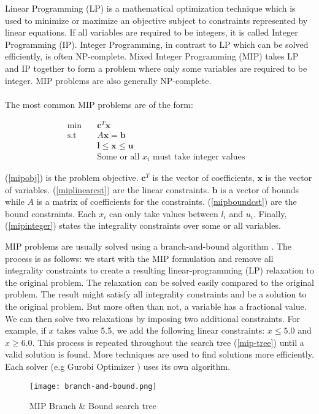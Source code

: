 \documentclass[../../thesis.tex]{subfiles}
\begin{document}
Linear Programming (LP) is a mathematical optimization technique which is used to minimize or maximize 
an objective subject to constraints represented by linear equations. 
If all variables are required to be integers, it is called Integer Programming (IP). 
Integer Programming, in contrast to LP which can be solved efficiently, is often NP-complete.  
Mixed Integer Programming (MIP) takes LP and IP together to form a problem where only some variables 
are required to be integer. MIP problems are also generally NP-complete.

\paragraph{}

The most common MIP problems are of the form:

\begin{align}
  \textrm{min} \quad & \bm{c}^T\bm{x} & \label{mipobj} \\ 
  \textrm{s.t} \quad & A\bm{x} = \bm{b} & \label{miplinearcst} \\
   & \bm{l} \leq \bm{x} \leq \bm{u} & \label{mipboundcst} \\
   & \text{Some or all $x_i$ must take integer values} \label{mipinteger}
\end{align}

(\ref{mipobj}) is the problem objective. $\bm{c}^T$ is the vector of coefficients, $\bm{x}$ is the vector of variables.
(\ref{miplinearcst}) are the linear constraints. $\bm{b}$ is a vector of bounds while $A$ is a matrix of coefficients for the constraints.
(\ref{mipboundcst}) are the bound constraints. Each $x_i$ can only take values between $l_i$ and $u_i$.
Finally, (\ref{mipinteger}) states the integrality constraints over some or all variables.


MIP problems are usually solved using a branch-and-bound algorithm \cite{mip-basics}.
The process is as follows: we start with the MIP formulation and remove all integrality constraints 
to create a resulting linear-programming (LP) relaxation to the original problem. The relaxation can be solved 
easily compared to the original problem. The result might satisfy all integrality constraints and be a solution to the original problem.
But more often than not, a variable has a fractional value.
We can then solve two relaxations by imposing two additional constraints. For example, if $x$ takes value 5.5, we add the 
following linear constraints: $x \leq 5.0$ and $x \geq 6.0$. 
This process is repeated throughout the search tree (\autoref{mip-tree}) until a valid solution is found.
More techniques are used to find solutions more efficiently. Each solver (e.g Gurobi Optimizer \cite{mip-basics}) uses its
own algorithm.

\begin{figure}
  \centering
  \texttt{[image: branch-and-bound.png]}
  \caption{MIP Branch \& Bound search tree \cite{mip-basics}}
  \label{mip-tree}
\end{figure}
\end{document}
